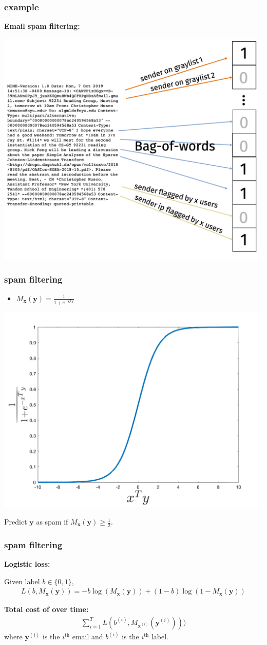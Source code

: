 \documentclass[compress]{beamer}
\newcommand{\bv}[1]{\mathbf{#1}}
\begin{document}
\begin{frame}
	\frametitle{example}
	\textbf{Email spam filtering:}
	\begin{center}
		\includegraphics[width=.7\textwidth]{spam_features.png}
	\end{center}
\end{frame}

\begin{frame}
	\frametitle{spam filtering}
	\begin{itemize}
		\item $M_{\bv{x}}(\bv{y}) = \frac{1}{1 + e^{-\bv{x}^T\bv{y}}}$
	\end{itemize}
	\begin{center}
		\includegraphics[width=.7\textwidth]{logistic_link.png}
	\end{center}
	Predict $\bv{y}$ as spam if $M_{\bv{x}}(\bv{y}) \geq \frac{1}{2}$.
\end{frame}

\begin{frame}
	\frametitle{spam filtering}
	\textbf{Logistic loss:}
	
	Given label $b\in \{0,1\}$,
	\begin{align*}
		L(b, M_{\bv{x}}(\bv{y})) = -b \log\left(M_{\bv{x}}(\bv{y})\right) + (1-b)\log\left(1 - M_{\bv{x}}(\bv{y})\right)
	\end{align*}
	
	\textbf{Total cost of over time:}
	\begin{align*}
	\sum_{i=1}^T L(b^{(i)}, M_{\bv{x}^{(i)}}(\bv{y}^{(i)}))) 
	\end{align*}
	where $\bv{y}^{(i)}$ is the $i^\text{th}$ email and  $b^{(i)}$ is the $i^\text{th}$ label. 
\end{frame}
\end{document}
